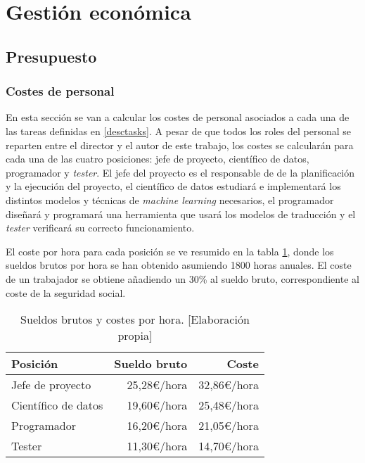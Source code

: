 \section{Gestión económica}\label{budget}
\subsection{Presupuesto}
\subsubsection{Costes de personal}
En esta sección se van a calcular los costes de personal asociados a cada una de las tareas
definidas en \ref{desctasks}. A pesar de que todos los roles del personal se reparten entre
el director y el autor de este trabajo, los costes se calcularán para cada una de las cuatro
posiciones: jefe de proyecto, científico de datos, programador y \textit{tester}.
El jefe del proyecto es el responsable de de la planificación y la ejecución del proyecto,
el científico de datos estudiará e implementará los distintos modelos y técnicas de
\textit{machine learning} necesarios, el programador diseñará y programará una herramienta
que usará los modelos de traducción y el \textit{tester} verificará su correcto funcionamiento.

El coste por hora para cada posición se ve resumido en la tabla \ref{costtable}, donde
los sueldos brutos por hora se han obtenido asumiendo 1800 horas anuales. El coste de un
trabajador se obtiene añadiendo un 30\% al sueldo bruto, correspondiente al coste
de la seguridad social. 

\begin{table}[ht]
\begin{center}
    
    \begin{tabular}{ l r r }
     Posición & Sueldo bruto & Coste \\
     \hline
     Jefe de proyecto & 25,28\euro/hora \cite{Projectmanagercost} & 32,86\euro/hora \\
     Científico de datos & 19,60\euro/hora \cite{Datascientistcost} & 25,48\euro/hora \\
     Programador & 16,20\euro/hora \cite{Programmercost} & 21,05\euro/hora \\
     Tester & 11,30\euro/hora \cite{Testercost} & 14,70\euro/hora \\
    \end{tabular}
    \caption{Sueldos brutos y costes por hora. [Elaboración propia]}\label{costtable}
    
\end{center}
\end{table}

